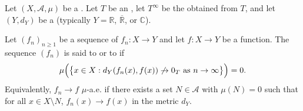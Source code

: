 \begin{definition} \label{definition:almost_sure_convergence_of_a_sequence_of_measurable_functions_from_a_measure_space_to_a_metric_space}
Let $(X, \mathcal{A}, \mu)$ be a . Let $T$ be an , let $T^\infty$ be the  obtained from $T$, and let $(Y, d_Y)$ be a  (typically $Y = \mathbb{R}$, $\overline{\mathbb{R}}$, or $\mathbb{C}$).

Let $(f_n)_{n \geq 1}$ be a sequence of  $f_n : X \to Y$ and let $f : X \to Y$ be a function. The sequence $(f_n)$ is said to  or to  if
$$\mu\Bigl(\bigl\{x \in X : d_Y(f_n(x), f(x)) \not\to 0_T \text{ as } n \to \infty\bigr\}\Bigr) = 0.$$
Equivalently, $f_n \to f$ $\mu$-a.e. if there exists a set $N \in \mathcal{A}$ with $\mu(N) = 0$ such that for all $x \in X \setminus N$, $f_n(x) \to f(x)$ in the metric $d_Y$.
\end{definition}
